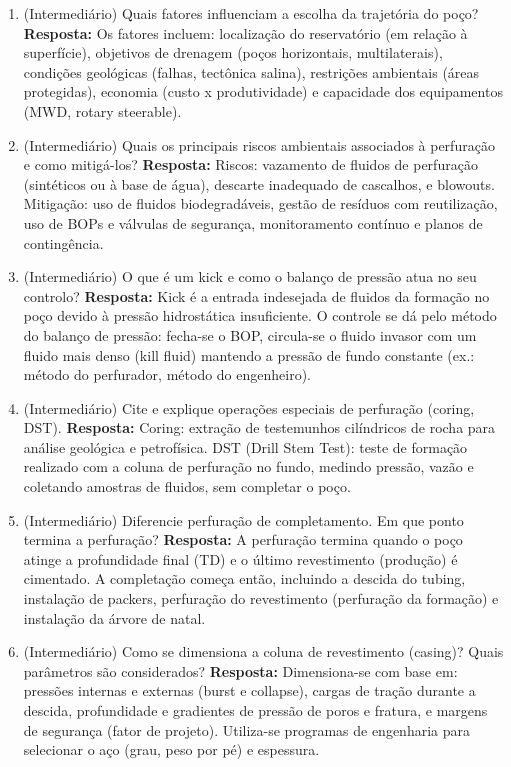 \documentclass[11pt,a4paper]{article}
\begin{document}
\begin{enumerate}
  \item (Intermediário) Quais fatores influenciam a escolha da trajetória do poço?
  \textbf{Resposta:} Os fatores incluem: localização do reservatório (em relação à superfície), objetivos de drenagem (poços horizontais, multilaterais), condições geológicas (falhas, tectônica salina), restrições ambientais (áreas protegidas), economia (custo x produtividade) e capacidade dos equipamentos (MWD, rotary steerable).

  \item (Intermediário) Quais os principais riscos ambientais associados à perfuração e como mitigá-los?
  \textbf{Resposta:} Riscos: vazamento de fluidos de perfuração (sintéticos ou à base de água), descarte inadequado de cascalhos, e blowouts. Mitigação: uso de fluidos biodegradáveis, gestão de resíduos com reutilização, uso de BOPs e válvulas de segurança, monitoramento contínuo e planos de contingência.

  \item (Intermediário) O que é um kick e como o balanço de pressão atua no seu controlo?
  \textbf{Resposta:} Kick é a entrada indesejada de fluidos da formação no poço devido à pressão hidrostática insuficiente. O controle se dá pelo método do balanço de pressão: fecha-se o BOP, circula-se o fluido invasor com um fluido mais denso (kill fluid) mantendo a pressão de fundo constante (ex.: método do perfurador, método do engenheiro).

  \item (Intermediário) Cite e explique operações especiais de perfuração (coring, DST).
  \textbf{Resposta:} Coring: extração de testemunhos cilíndricos de rocha para análise geológica e petrofísica. DST (Drill Stem Test): teste de formação realizado com a coluna de perfuração no fundo, medindo pressão, vazão e coletando amostras de fluidos, sem completar o poço.

  \item (Intermediário) Diferencie perfuração de completamento. Em que ponto termina a perfuração?
  \textbf{Resposta:} A perfuração termina quando o poço atinge a profundidade final (TD) e o último revestimento (produção) é cimentado. A completação começa então, incluindo a descida do tubing, instalação de packers, perfuração do revestimento (perfuração da formação) e instalação da árvore de natal.

  \item (Intermediário) Como se dimensiona a coluna de revestimento (casing)? Quais parâmetros são considerados?
  \textbf{Resposta:} Dimensiona-se com base em: pressões internas e externas (burst e collapse), cargas de tração durante a descida, profundidade e gradientes de pressão de poros e fratura, e margens de segurança (fator de projeto). Utiliza-se programas de engenharia para selecionar o aço (grau, peso por pé) e espessura.


\end{enumerate}
\end{document}
